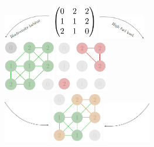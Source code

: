 \begin{figure}[H]
    \centering
    \includegraphics[width = 0.18\textwidth]{figures/wildland/arrow_biod.PNG}
    \includegraphics[width = 0.18\textwidth]{figures/wildland/land3.PNG}
    \includegraphics[width = 0.18\textwidth]{figures/wildland/arrow_fuel.PNG}
    \\
    \includegraphics[width=0.2\textwidth]{figures/wildland/biodiv_3.PNG} \hspace*{4cm}
    \includegraphics[width=0.2\textwidth]{figures/wildland/fire_3.PNG}\\
    \includegraphics[width=0.18\textwidth]{figures/wildland/arrow_right.PNG}
    \includegraphics[width = 0.2\textwidth]{figures/wildland/graphe_feu_biod_33.PNG}
 	\includegraphics[width=0.18\textwidth]{figures/wildland/back_left.PNG}

\end{figure}
